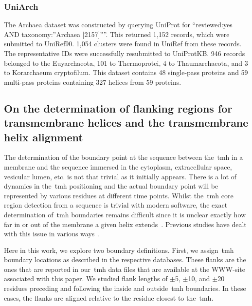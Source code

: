 \subsubsection{UniArch}
The Archaea dataset was constructed by querying UniProt for ``reviewed:yes AND taxonomy:''Archaea [2157]''''.
This returned 1,152 records, which were submitted to UniRef90.
1,054 clusters were found in UniRef from these records.
The representative IDs were successfully resubmitted to UniProtKB.
946 records belonged to the Euyarchaeota, 101 to Thermoprotei, 4 to Thaumarchaeota, and 3 to Korarchaeum cryptofilum.
This dataset contains 48 single\--pass proteins and 59 multi\--pass proteins containing 327 helices from 59 proteins.


\subsection{On the determination of flanking regions for transmembrane helices and the transmembrane helix alignment}

The determination of the boundary point at the sequence between the~\gls{tmh} in a membrane and the sequence immersed in the cytoplasm, extracellular space, vesicular lumen, etc.
is not that trivial as it initially appears.
There is a lot of dynamics in the~\gls{tmh} positioning and the actual boundary point will be represented by various residues at different time points.
Whilst the~\gls{tmh} core region detection from a sequence is trivial with modern software, the exact determination of~\gls{tmh} boundaries remains difficult since it is unclear exactly how far in or out of the membrane a given helix extends~\cite{Ojemalm2013}.
Previous studies have dealt with this issue in various ways~\cite{Sharpe2010, Baeza-Delgado2013, Pogozheva2013, White2008}.

Here in this work, we explore two boundary definitions.
First, we assign~\gls{tmh} boundary locations as described in the respective databases.
These flanks are the ones that are reported in our~\gls{tmh} data files that are available at the WWW-site associated with this paper.
We studied flank lengths of $\pm$5, $\pm$10, and $\pm$20 residues preceding and following the inside and outside~\gls{tmh} boundaries.
In these cases, the flanks are aligned relative to the residue closest to the~\gls{tmh}.

